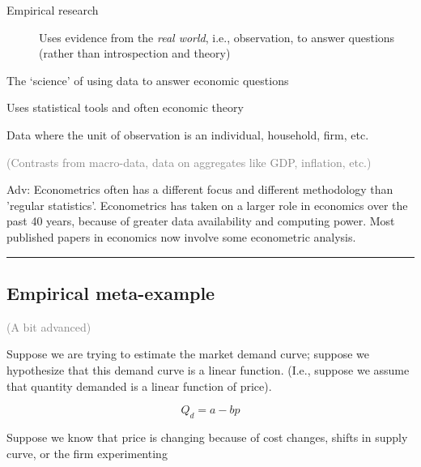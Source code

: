 \documentclass[]{article}
\providecommand{\tightlist}{%
  \setlength{\itemsep}{0pt}\setlength{\parskip}{0pt}}
\begin{document}
\begin{description}
\item[Empirical research]
Uses evidence from the \emph{real world}, i.e., observation, to answer questions (rather than introspection and theory)
\end{description}

\bigskip

\begin{description}
\tightlist
\item[Econometrics]
The `science' of using data to answer economic questions

Uses statistical tools and often economic theory
\end{description}

\bigskip

\begin{description}
\tightlist
\item[Micro-data]
Data where the unit of observation is an individual, household, firm, etc.

\textcolor{gray}{(Contrasts from macro-data, data on aggregates like GDP, inflation, etc.)}
\end{description}

\textcolor{RawSienna}{Adv: Econometrics often has a different focus and different methodology than 'regular statistics'. Econometrics has taken on a larger role in economics over the past 40 years, because of greater data availability and computing power.  Most published papers in economics now involve some econometric analysis.}

\begin{center}\rule{0.5\linewidth}{\linethickness}\end{center}

\hypertarget{empirical-meta-example}{%
\subsection{Empirical meta-example}\label{empirical-meta-example}}

\textcolor{gray}{(A bit advanced)}

Suppose we are trying to estimate the market demand curve; suppose we hypothesize that this demand curve is a linear function.
(I.e., suppose we assume that quantity demanded is a linear function of price).

\[Q_d = a-bp\]

Suppose we know that price is changing because of cost changes, shifts in supply curve, or the firm experimenting
\end{document}
